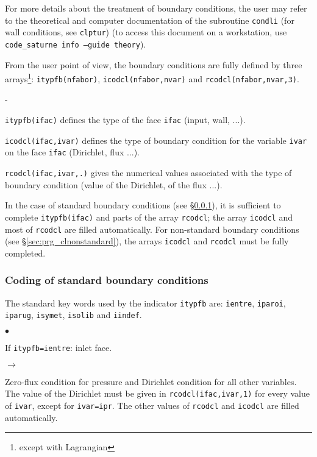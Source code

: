 {{{For more details about the treatment of boundary conditions, the user
may refer to the theoretical and computer documentation \cite{theory} of
the subroutine \texttt{condli} (for wall conditions, see
\texttt{clptur}) (to access this document on a workstation, use
\mbox{\texttt{code\_saturne~info --guide theory}}).

From the user point of view, the boundary conditions are fully
defined by three arrays\footnote{except with Lagrangian}:
\texttt{itypfb(nfabor)},
\texttt{icodcl(nfabor,nvar)} and
\texttt{rcodcl(nfabor,nvar,3)}.
\begin{list}{-}{}
\item \texttt{itypfb(ifac)} defines the type of the face \texttt{ifac}
      (input, wall, ...).
\item \texttt{icodcl(ifac,ivar)} defines the type of boundary
      condition for the variable \texttt{ivar} on the face \texttt{ifac}
      (Dirichlet, flux ...).
\item \texttt{rcodcl(ifac,ivar,.)} gives the numerical values associated with the
      type of boundary condition (value of the Dirichlet, of the flux ...).
\end{list}

In the case of standard boundary conditions (see
\S\ref{sec:prg_clstandard}), it is sufficient to complete \texttt{itypfb(ifac)} and
parts of the array \texttt{rcodcl}; the array \texttt{icodcl} and most of \texttt{rcodcl} are filled automatically. For non-standard boundary
conditions (see \S\ref{sec:prg_clnonstandard}), the arrays \texttt{icodcl} and
\texttt{rcodcl} must be fully completed.

\subsubsection{Coding of standard boundary conditions}
\label{sec:prg_clstandard}%
The standard key words used by the indicator \texttt{itypfb} are:
\texttt{ientre}, \texttt{iparoi},
\texttt{iparug}, \texttt{isymet},
\texttt{isolib} and \texttt{iindef}.

\begin{list}{$\bullet$}{}
\item If \texttt{itypfb=ientre}: inlet face.

\begin{list}{$\rightarrow$}{}
\item Zero-flux condition for pressure and Dirichlet condition for all
      other variables. The value of the Dirichlet must be given in
      \texttt{rcodcl(ifac,ivar,1)} for every value of \texttt{ivar}, except for
      \texttt{ivar=ipr}. The other values of \texttt{rcodcl} and
      \texttt{icodcl} are filled automatically.
\end{list}


\end{list}}}}
